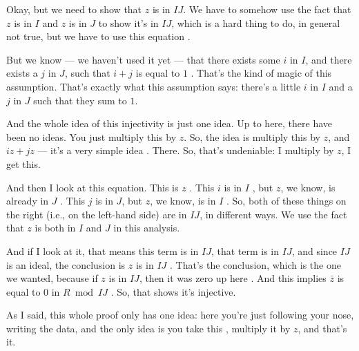 \begin{proofWrapper}
\begin{speech}[00:07:08 - 00:09:16]
Okay, but we need to show that $z$ is in $IJ$. We have to somehow use the fact that $z$ is in $I$ and $z$ is in $J$ to show it's in $IJ$, which is a hard thing to do, in general not true, but we have to use this equation .

But we know --- we haven't used it yet --- that there exists some $i$ in $I$, and there exists a $j$ in $J$, such that $i + j$ is equal to $1$ . That's the kind of magic of this assumption. That's exactly what this assumption says: there's a little $i$ in $I$ and a $j$ in $J$ such that they sum to $1$.

And the whole idea of this injectivity is just one idea. Up to here, there have been no ideas. You just multiply this by $z$. So, the idea is multiply this by $z$, and $iz + jz$ --- it's a very simple idea . There. So, that's undeniable: I multiply by $z$, I get this.

And then I look at this equation. This is $z$ . This $i$ is in $I$ , but $z$, we know, is already in $J$ . This $j$ is in $J$, but $z$, we know, is in $I$ . So, both of these things on the right (i.e., on the left-hand side) are in $IJ$, in different ways. We use the fact that $z$ is both in $I$ and $J$ in this analysis.

And if I look at it, that means this term is in $IJ$, that term is in $IJ$, and since $IJ$ is an ideal, the conclusion is $z$ is in $IJ$ . That's the conclusion, which is the one we wanted, because if $z$ is in $IJ$, then it was zero up here . And this implies $\bar{z}$ is equal to $0$ in $R \bmod IJ$ . So, that shows it's injective.

As I said, this whole proof only has one idea: here you're just following your nose, writing the data, and the only idea is you take this , multiply it by $z$, and that's it.
\end{speech}


\end{proofWrapper}
